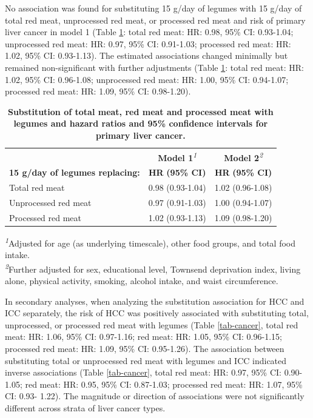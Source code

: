 \documentclass[sn-basic,Numbered,iicol,pdflatex]{sn-jnl}
\begin{document}
No association was found for substituting 15 g/day of legumes with 15
g/day of total red meat, unprocessed red meat, or processed red meat and
risk of primary liver cancer in model 1 (Table \ref{tab-main}: total red
meat:
HR: 0.98, 95\% CI: 0.93-1.04;
unprocessed red meat:
HR: 0.97, 95\% CI: 0.91-1.03;
processed red meat:
HR: 1.02, 95\% CI: 0.93-1.13).
The estimated associations changed minimally but remained
non-significant with further adjustments (Table \ref{tab-main}: total
red meat:
HR: 1.02, 95\% CI: 0.96-1.08;
unprocessed red meat:
HR: 1.00, 95\% CI: 0.94-1.07;
processed red meat:
HR: 1.09, 95\% CI: 0.98-1.20).

\begin{table}[!t]
\caption{{\small \textbf{Substitution of total meat, red meat and processed meat with legumes and hazard ratios and 95\% confidence intervals for primary liver cancer.}}}\label{tab-main}
\begin{tabular*}{1\linewidth}{@{\extracolsep{\fill}}lcc}
\toprule
 & {\bfseries \textbf{Model 1}}\textsuperscript{\textit{1}} & {\bfseries \textbf{Model 2}}\textsuperscript{\textit{2}} \\ 
\cmidrule(lr){2-2} \cmidrule(lr){3-3}
\textbf{15 g/day of legumes replacing:} & \textbf{HR} \textbf{(95\% CI)} & \textbf{HR} \textbf{(95\% CI)} \\ 
\midrule\addlinespace[2.5pt]
Total red meat & 0.98 (0.93-1.04) & 1.02 (0.96-1.08) \\ 
Unprocessed red meat & 0.97 (0.91-1.03) & 1.00 (0.94-1.07) \\ 
Processed red meat & 1.02 (0.93-1.13) & 1.09 (0.98-1.20) \\ 
\bottomrule
\end{tabular*}
\begin{minipage}{\linewidth}
\textsuperscript{\textit{1}}Adjusted for age (as underlying timescale), other food groups, and total food intake.\\
\textsuperscript{\textit{2}}Further adjusted for sex, educational level, Townsend deprivation index, living alone, physical activity, smoking, alcohol intake, and waist circumference.\\
\end{minipage}
\end{table}

In secondary analyses, when analyzing the substitution association for
HCC and ICC separately, the risk of HCC was positively associated with
substituting total, unprocessed, or processed red meat with legumes
(Table \ref{tab-cancer}, total red meat:
HR: 1.06, 95\% CI: 0.97-1.16;
red meat:
HR: 1.05, 95\% CI: 0.96-1.15;
processed red meat:
HR: 1.09, 95\% CI: 0.95-1.26).
The association between substituting total or unprocessed red meat with
legumes and ICC indicated inverse associations (Table \ref{tab-cancer},
total red meat:
HR: 0.97, 95\% CI: 0.90-1.05;
red meat:
HR: 0.95, 95\% CI: 0.87-1.03;
processed red meat:
HR: 1.07, 95\% CI: 0.93- 1.22).
The magnitude or direction of associations were not significantly
different across strata of liver cancer types.
\end{document}
